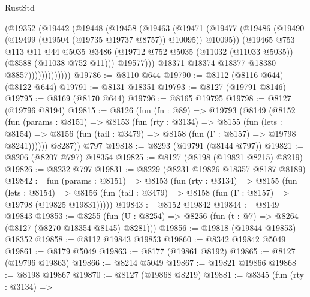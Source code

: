 \begin{lexlean}{RustStd}
\begin{coremodule}
                      (@19352
                        (@19442
                          (@19448
                            (@19458
                              (@19463
                                (@19471
                                  (@19477
                                    (@19486
                                      (@19490 (@19499 (@19504 (@19735 @19737 @8757)) @10095))
                                      @10095))
                                  (@19465
                                    @753
                                    @113
                                    @11
                                    @44
                                    @5035
                                    @3486
                                    (@19712
                                      @752
                                      @5035
                                      (@11032 (@11033 @5035))
                                      (@8588 (@11038 @752 @11)))
                                    @19577)))
                              @18371
                              @18374
                              @18377
                              @18380
                              @8857)))))))))))))
@19786 := @8110 @644
@19790 := @8112 (@8116 @644) (@8122 @644)
@19791 := @8131 @18351
@19793 := @8127 (@19791 @8146)
@19795 := @8169 (@8170 @644)
@19796 := @8165 @19795
@19798 := @8127 (@19796 @8194)
@19815 := @8126
    (fun (fn : @89) =>
    @19793
      (@8149
        (@8152
          (fun (params : @8151) =>
          @8153
            (fun (rty : @3134) =>
            @8155
              (fun (lets : @8154) =>
              @8156 (fun (tail : @3479) => @8158 (fun (Γ : @8157) => @19798 @8241))))))
        @8287))
    @797
@19818 := @8293 (@19791 (@8144 @797))
@19821 := @8206 (@8207 @797) @18354
@19825 := @8127 (@8198 (@19821 @8215) @8219)
@19826 := @8232 @797
@19831 := @8229 (@8231 @19826 @18357 @8187 @8189)
@19842 := fun (params : @8151) =>
  @8153
    (fun (rty : @3134) =>
    @8155
      (fun (lets : @8154) =>
      @8156 (fun (tail : @3479) => @8158 (fun (Γ : @8157) => @19798 (@19825 @19831)))))
@19843 := @8152 @19842
@19844 := @8149 @19843
@19853 := @8255
    (fun (U : @8254) => @8256 (fun (t : @7) => @8264 (@8127 (@8270 @18354 @8145) @8281)))
@19856 := @19818 (@19844 @19853) @18352
@19858 := @8112 @19843 @19853
@19860 := @8342 @19842 @5049
@19861 := @8179 @5049
@19863 := @8177 (@19861 @8192)
@19865 := @8127 (@19796 @19863)
@19866 := @8214 @5049
@19867 := @19821 @19866
@19868 := @8198 @19867
@19870 := @8127 (@19868 @8219)
@19881 := @8345
    (fun (rty : @3134) =>

\end{coremodule}
\end{lexlean}
